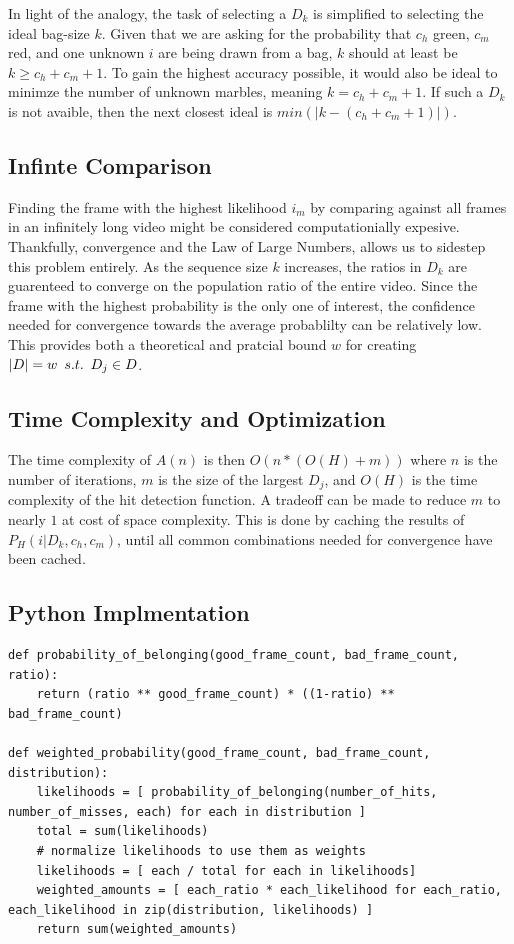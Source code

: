 \documentclass{article}
\def\suchThat{\hspace{0.5em} s.t. \hspace{0.5em}}
\begin{document}
\begin{adjustwidth}{2.5em}{0pt}
        In light of the analogy, the task of selecting a $D_k$ is simplified to selecting the ideal bag-size $k$. Given that we are asking for the probability that $c_h$ green, $c_m$ red, and one unknown $i$ are being drawn from a bag, $k$ should at least be $k \geq c_h + c_m + 1$. To gain the highest accuracy possible, it would also be ideal to minimze the number of unknown marbles, meaning $k = c_h + c_m + 1$. If such a $D_k$ is not avaible, then the next closest ideal is $min(|k - (c_h + c_m + 1)|)$.
    
    \subsection{Infinte Comparison}
        Finding the frame with the highest likelihood $i_m$ by comparing against all frames in an infinitely long video might be considered computationially expesive. Thankfully, convergence and the Law of Large Numbers, allows us to sidestep this problem entirely. As the sequence size $k$ increases, the ratios in $D_k$ are guarenteed to converge on the population ratio of the entire video. Since the frame with the highest probability is the only one of interest, the confidence needed for convergence towards the average probablilty can be relatively low. This provides both a theoretical and pratcial bound $w$ for creating $|D| = w \suchThat D_j \in D$.
        
    \subsection{Time Complexity and Optimization}
        The time complexity of $A(n)$ is then $O(n * (O(H) + m))$ where $n$ is the number of iterations, $m$ is the size of the largest $D_j$, and $O(H)$ is the time complexity of the hit detection function. A tradeoff can be made to reduce $m$ to nearly $1$ at cost of space complexity. This is done by caching the results of $P_H(i | D_k, c_h, c_m)$, until all common combinations needed for convergence have been cached.
    
    \subsection{Python Implmentation}
        \begin{verbatim}
def probability_of_belonging(good_frame_count, bad_frame_count, ratio):
    return (ratio ** good_frame_count) * ((1-ratio) ** bad_frame_count)

def weighted_probability(good_frame_count, bad_frame_count, distribution):
    likelihoods = [ probability_of_belonging(number_of_hits, number_of_misses, each) for each in distribution ]
    total = sum(likelihoods)
    # normalize likelihoods to use them as weights
    likelihoods = [ each / total for each in likelihoods]
    weighted_amounts = [ each_ratio * each_likelihood for each_ratio, each_likelihood in zip(distribution, likelihoods) ]
    return sum(weighted_amounts)


\end{verbatim}
\end{adjustwidth}
\end{document}
